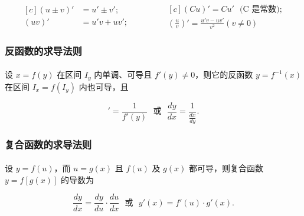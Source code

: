 \begin{equation}
\begin{aligned}[c]
  (u \pm v)' &= u' \pm v'; \\
  (uv)' & = u'v + uv';
\end{aligned}
\qquad \qquad
\begin{aligned}[c]
  (Cu)' = Cu' \text{~~(C 是常数)}; \\
  \left(\frac{u}{v}\right)' = \frac{u'v - uv'}{v^2}(v \neq 0)
\end{aligned}
\end{equation}

\subsubsection{反函数的求导法则}
\paragraph{}
设 $x = f(y)$ 在区间 $I_y$ 内单调、可导且 $f'(y) \neq 0$，则它的反函数 $y = f^{-1}(x)$ 在区间 $I_x = f(I_y)$ 内也可导，且

\begin{equation}
[f^{-1}(x)]' = \frac{1}{f'(y)} \text{~~或~~} \frac{dy}{dx} = \frac{1}{\frac{dx}{dy}}.
\end{equation}

\subsubsection{复合函数的求导法则}
\paragraph{}
设 $y = f(u)$，而 $u = g(x)$ 且 $f(u)$ 及 $g(x)$ 都可导，则复合函数 $y = f[g(x)]$ 的导数为

\begin{equation}
\frac{dy}{dx} = \frac{dy}{du} \cdot \frac{du}{dx} \text{~~或~~} y'(x) = f'(u) \cdot g'(x).
\end{equation}
